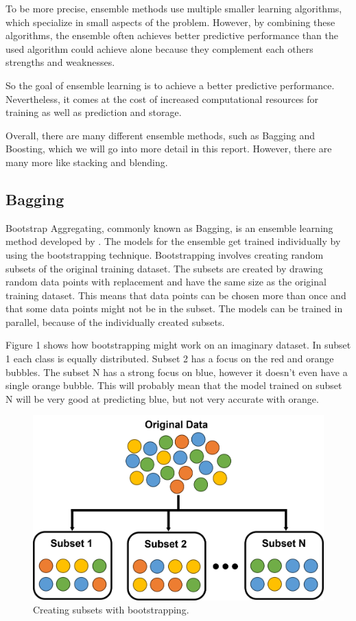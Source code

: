 To be more precise, ensemble methods use multiple smaller learning algorithms,
which specialize in small aspects of the problem. However, by combining these
algorithms, the ensemble often achieves better predictive performance than 
the used algorithm could achieve alone because they complement each others
strengths and weaknesses.

So the goal of ensemble learning is to achieve a better predictive performance.
Nevertheless, it comes at the cost of increased computational resources for 
training as well as prediction and storage.

Overall, there are many different ensemble methods, such as Bagging and Boosting, 
which we will go into more detail in this report. However, there are many more 
like stacking and blending.
\subsection{Bagging}

Bootstrap Aggregating, commonly known as Bagging, is an ensemble learning method
developed by \citet*{Breiman1996}. The models for the ensemble get trained individually
by using the bootstrapping technique. Bootstrapping involves creating random
subsets of the original training dataset. The subsets are created by drawing 
random data points with replacement and have the same size as the original
training dataset. This means that data points can be chosen more than once and
that some data points might not be in the subset. The models can be trained in
parallel, because of the individually created subsets.


Figure 1 shows how bootstrapping might work on an imaginary dataset. In subset 1
each class is equally distributed. Subset 2 has a focus on the red and orange bubbles.
The subset N has a strong focus on blue, however it doesn't even have a single 
orange bubble. This will probably mean that the model trained on subset N will be very
good at predicting blue, but not very accurate with orange.

\begin{figure}[htbp]
    \centering
    \includegraphics[width=.5\textwidth]{figures/bootstrapping}
    \caption{Creating subsets with bootstrapping.}
\end{figure}

